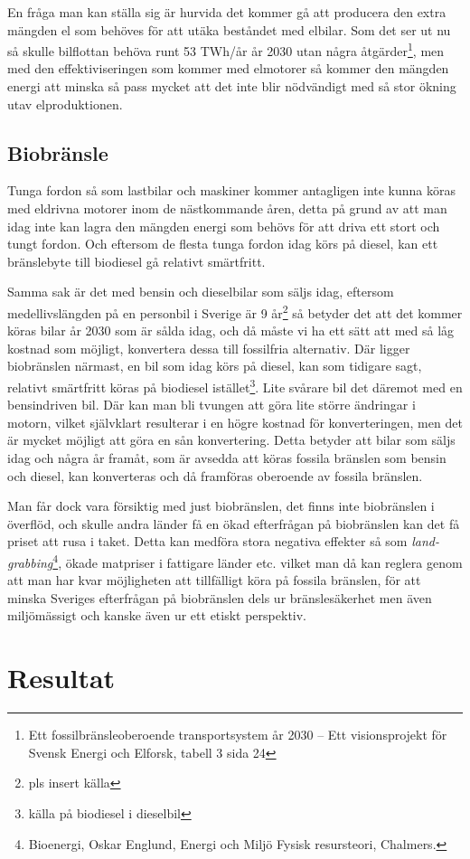 \documentclass[a4paper,11pt,fleqn, titlepage]{article}
\begin{document}
En fråga man kan ställa sig är hurvida det kommer gå att producera den extra mängden el som behöves för att utäka beståndet med elbilar. Som det ser ut nu så skulle bilflottan behöva runt 53 TWh/år år 2030 utan några åtgärder\footnote{Ett fossilbränsleoberoende transportsystem år 2030 – Ett visionsprojekt för Svensk Energi och Elforsk, tabell 3 sida 24}, men med den effektiviseringen som kommer med elmotorer så kommer den mängden energi att minska så pass mycket att det inte blir nödvändigt med så stor ökning utav elproduktionen.

\subsection{Biobränsle}
Tunga fordon så som lastbilar och maskiner kommer antagligen inte kunna
köras med eldrivna motorer inom de nästkommande åren, detta på grund av att
man idag inte kan lagra den mängden energi som behövs för att driva ett
stort och tungt fordon. Och eftersom de flesta tunga fordon idag körs på
diesel, kan ett bränslebyte till biodiesel gå relativt smärtfritt.

Samma sak är det med bensin och dieselbilar som säljs idag, eftersom
medellivslängden på en personbil i Sverige är 9 år\footnote{pls insert
källa} så betyder det att det kommer köras bilar år 2030 som är sålda idag,
och då måste vi ha ett sätt att med så låg kostnad som möjligt, konvertera
dessa till fossilfria alternativ. Där ligger biobränslen närmast, en bil
som idag körs på diesel, kan som tidigare sagt, relativt smärtfritt köras
på biodiesel istället\footnote{källa på biodiesel i dieselbil}. Lite
svårare bil det däremot med en bensindriven bil. Där kan man bli tvungen
att göra lite större ändringar i motorn, vilket självklart resulterar i en
högre kostnad för konverteringen, men det är mycket möjligt att göra en sån
konvertering. Detta betyder att bilar som säljs idag och några år framåt,
som är avsedda att köras fossila bränslen som bensin och diesel, kan
konverteras och då framföras oberoende av fossila bränslen.

Man får dock vara försiktig med just biobränslen, det finns inte
biobränslen i överflöd, och skulle andra länder få en ökad efterfrågan på
biobränslen kan det få priset att rusa i taket. Detta kan medföra stora
negativa effekter så som \emph{land-grabbing}\footnote{Bioenergi, Oskar
Englund, Energi och Miljö Fysisk resursteori, Chalmers.}, ökade matpriser i
fattigare länder etc. vilket man då kan reglera genom att man har kvar
möjligheten att tillfälligt köra på fossila bränslen, för att minska
Sveriges efterfrågan på biobränslen dels ur bränslesäkerhet men även
miljömässigt och kanske även ur ett etiskt perspektiv.

\section{Resultat}
\end{document}
